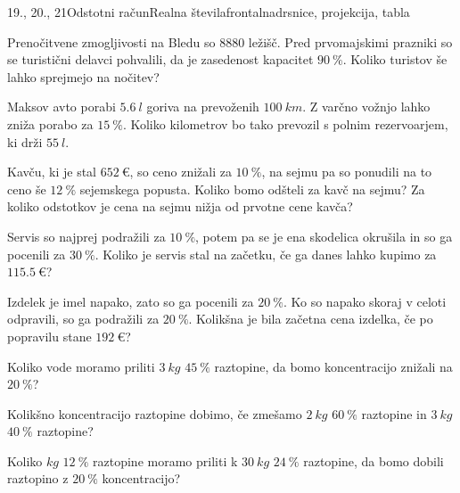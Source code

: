 \begin{priprava}{19., 20., 21}{}{Odstotni račun}{Realna števila}{frontalna}{drsnice, projekcija, tabla}
        \begin{naloga}
            Prenočitvene zmogljivosti na Bledu so $8880$ ležišč. Pred prvomajskimi prazniki so se turistični delavci pohvalili,
            da je zasedenost kapacitet $90~\%$. Koliko turistov še lahko sprejmejo na nočitev? 
        \end{naloga}

        \begin{naloga}
            Maksov avto porabi $5.6~l$ goriva na prevoženih $100~km$. 
            Z varčno vožnjo lahko zniža porabo za $15~\%$.
            Koliko kilometrov bo tako prevozil s polnim rezervoarjem, ki drži $55~l$. 
        \end{naloga}
    


    
        \begin{naloga}
            Kavču, ki je stal $652~€$, so ceno znižali za $10~\%$, na sejmu pa so ponudili na to ceno še $12~\%$ sejemskega popusta.
            Koliko bomo odšteli za kavč na sejmu? Za koliko odstotkov je cena na sejmu nižja od prvotne cene kavča? 
        \end{naloga}

        
        \begin{naloga}
            Servis so najprej podražili za $10~\%$, potem pa se je ena skodelica okrušila in so ga pocenili za $30~\%$.
            Koliko je servis stal na začetku, če ga danes lahko kupimo za $115.5~€$? 
        \end{naloga}

        \begin{naloga}
            Izdelek je imel napako, zato so ga pocenili za $20~\%$. Ko so napako skoraj v celoti odpravili, so ga podražili za $20~\%$.
            Kolikšna je bila začetna cena izdelka, če po popravilu stane $192~€$? 
        \end{naloga}

    


    
        \begin{naloga}
            Koliko vode moramo priliti $3~kg$ $45~\%$ raztopine, da bomo koncentracijo znižali na $20~\%$? 
        \end{naloga}

        \begin{naloga}
            Kolikšno koncentracijo raztopine dobimo, če zmešamo $2~kg$ $60~\%$ raztopine in $3~kg$ $40~\%$ raztopine? 
        \end{naloga}

        \begin{naloga}
            Koliko $kg$ $12~\%$ raztopine moramo priliti k $30~kg$ $24~\%$ raztopine, da bomo dobili raztopino z $20~\%$ koncentracijo? 
        \end{naloga}
    


    
\end{priprava}